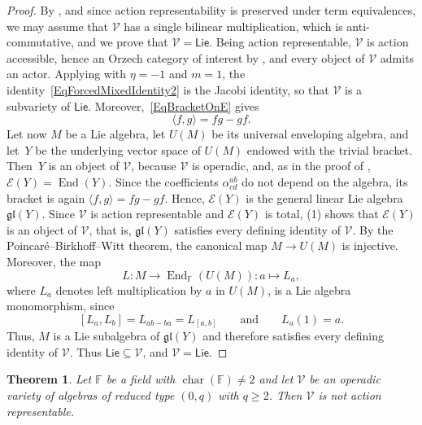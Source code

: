 \documentclass[reqno,a4paper]{amsart}
\theoremstyle{plain}
\newtheorem{theorem}[subsection]{Theorem}
\theoremstyle{definition}
\theoremstyle{remark}
\numberwithin{equation}{section}
\newcommand{\F}{\mathbb{F}}
\newcommand{\E}{\mathcal{E}}
\newcommand{\V}{\mathcal{V}}
\DeclareMathOperator{\bchar}{char}
\DeclareMathOperator{\End}{End}
\newcommand{\Lie}{\ensuremath{\mathsf{Lie}}}
\begin{document}
\begin{proof}
By , and since action representability is preserved under term equivalences, we may assume that $\V$ has a single bilinear multiplication, which is anti-commutative, and we prove that $\V=\Lie$. Being action representable, $\V$ is action accessible, hence an Orzech category of interest by , and every object of $\V$ admits an actor. Applying  with $\eta=-1$ and $m=1$, the identity~\eqref{EqForcedMixedIdentity2} is the Jacobi identity, so that $\V$ is a subvariety of $\Lie$. Moreover,~\eqref{EqBracketOnE} gives
\[
\langle f,g\rangle=fg-gf .
\]
Let now $M$ be a Lie algebra, let $U(M)$ be its universal enveloping algebra, and let~$Y$ be the underlying vector space of $U(M)$ endowed with the trivial bracket. Then~$Y$ is an object of $\V$, because $\V$ is operadic, and, as in the proof of , $\E(Y)=\End(Y)$. Since the coefficients $\alpha^{ab}_{cd}$ do not depend on the algebra, its bracket is again $\langle f,g\rangle=fg-gf$. Hence, $\E(Y)$ is the general linear Lie algebra $\mathfrak{gl}(Y)$. Since $\V$ is action representable and $\E(Y)$ is total, (1) shows that $\E(Y)$ is an object of $\V$, that is, $\mathfrak{gl}(Y)$ satisfies every defining identity of $\V$. By the Poincaré--Birkhoff--Witt theorem, the canonical map
$M\to U(M)$ is injective. Moreover, the map
\[
L \colon M\to\End_{\F}(U(M))\colon a\mapsto L_a,
\]
where $L_a$ denotes left multiplication by $a$ in $U(M)$, is a Lie algebra monomorphism, since
\[
[L_a,L_b]=L_{ab-ba}=L_{[a,b]}
\qquad\text{and}\qquad
L_a(1)=a.
\]
Thus, $M$ is a Lie subalgebra of $\mathfrak{gl}(Y)$ and therefore satisfies every defining identity of $\V$. Thus $\Lie\subseteq\V$, and $\V=\Lie$.
\end{proof}

\begin{theorem}\label{TheoremAntiCommNotAR}
Let $\F$ be a field with $\bchar(\F)\neq2$ and let $\V$ be an operadic variety of algebras of reduced type $(0,q)$ with $q\geq2$. Then $\V$ is not action representable.
\end{theorem}
\end{document}
